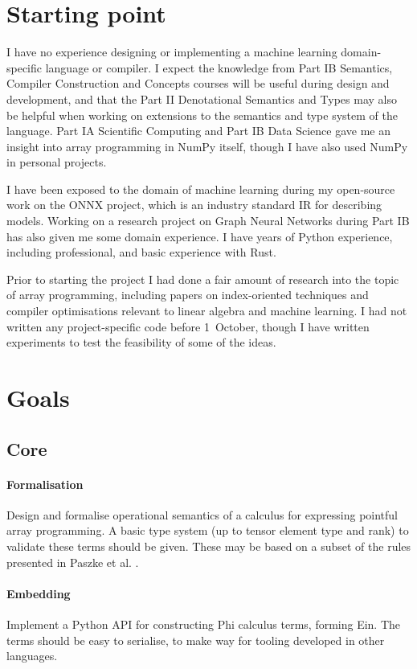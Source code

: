 \section{Starting point}

I have no experience designing or implementing a machine learning domain-specific language or compiler. I expect the knowledge from Part IB Semantics, Compiler Construction and Concepts courses will be useful during design and development, and that the Part II Denotational Semantics and Types may also be helpful when working on extensions to the semantics and type system of the language. Part IA Scientific Computing and Part IB Data Science gave me an insight into array programming in NumPy itself, though I have also used NumPy in personal projects.

I have been exposed to the domain of machine learning during my open-source work on the ONNX project, which is an industry standard IR for describing models. Working on a research project on Graph Neural Networks during Part IB has also given me some domain experience. I have years of Python experience, including professional, and basic experience with Rust.

Prior to starting the project I had done a fair amount of research into the topic of array programming, including papers on index-oriented techniques and compiler optimisations relevant to linear algebra and machine learning. I had not written any project-specific code before 1~October, though I have written experiments to test the feasibility of some of the ideas.

\section{Goals}

\subsection{Core}

\paragraph{Formalisation} Design and formalise operational semantics of a calculus for expressing pointful array programming. A basic type system (up to tensor element type and rank) to validate these terms should be given. These may be based on a subset of the rules presented in Paszke et al. \cite{Paszke2021GettingTT}.

\paragraph{Embedding} Implement a Python API for constructing Phi calculus terms, forming Ein. The terms should be easy to serialise, to make way for tooling developed in other languages.

